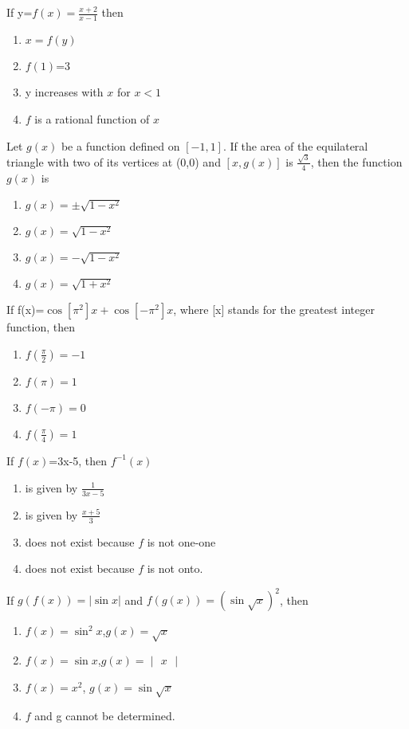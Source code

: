 \item If y=$f(x)=\frac{x+2}{x-1}$ then
\begin{enumerate}
\item $x=f(y)$
\item $f(1)$=3
\item y increases with $x$ for $x<1$
\item $f$ is a rational function of $x$
\end{enumerate}

\item Let $g(x)$ be a function defined on $[-1,1]$. If the area of the equilateral triangle with two of its vertices at (0,0) and $[x,g(x)]$ is $\frac{\sqrt{3}}{4}$, then the function $g(x)$ is
\begin{enumerate}
\item $g(x)=\pm\sqrt{1-x^2}$
\item $g(x)=\sqrt{1-x^2}$
\item $g(x)=-\sqrt{1-x^2}$
\item $g(x)=\sqrt{1+x^2}$
\end{enumerate}

\item If f(x)=$\cos [\pi^2]x + \cos [-\pi^2]x$, where [x] stands for the greatest integer function, then
\begin{enumerate}
\item $f(\frac{\pi}{2})=-1$
\item $f(\pi)=1$
\item $f(-\pi)=0$
\item $f(\frac{\pi}{4})=1$
\end{enumerate}

\item If $f(x)$=3x-5, then $f^{-1}(x)$
\begin{enumerate}
\item is given by $\frac{1}{3x-5}$
\item is given by $\frac{x+5}{3}$
\item does not exist because $f$ is not one-one
\item does not exist because $f$ is not onto.
\end{enumerate}

\item If $g(f(x))=|\sin x|$ and $f(g(x))=(\sin \sqrt{x})^2$, then
\begin{enumerate}
\item $f(x)= \sin^2x$,$g(x)=\sqrt{x}$
\item $f(x)=\sin x$,$g(x)= \begin{vmatrix} x \end{vmatrix}$
\item $f(x)=x^2$, $g(x)=\sin \sqrt{x}$
\item $f$ and g cannot be determined.
\end{enumerate}

